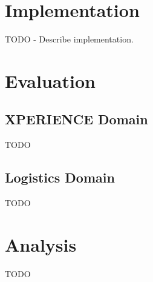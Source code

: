 \documentclass[12pt,twoside,abbrevs,msc,ai,notimes,logo,sansheadings]{infthesis}
\begin{document}
  \section {Implementation}
  TODO - Describe implementation.
  \section{Evaluation}
  \subsection{XPERIENCE Domain}
  TODO
  \subsection{Logistics Domain}
  TODO
  \section{Analysis}
  TODO
  
   
  
  
  
  

  \appendix


  {}
  
\end{document}
